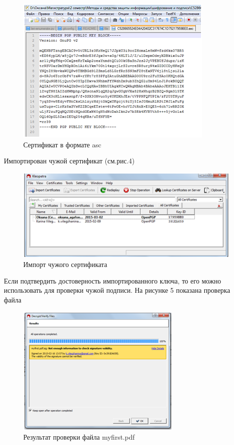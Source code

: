 \documentclass[10pt,a4paper]{article}
\begin{document}
\begin{figure}[h!]
\centering
\includegraphics[scale=0.67]{res/Sertifikat}
\caption{Сертификат в формате asc}
\end{figure}

\hspace{0,6cm}Импортирован чужой сертификат (см.рис.4)

\begin{figure}[h!]
\centering
\includegraphics[scale=0.67]{res/Sertifikat2}
\caption{Импорт чужого сертификата}
\end{figure}

\hspace{0,6cm} Если подтвердить достоверность импортированного ключа, то его можно использовать для проверки чужой подписи. На рисунке 5 показана проверка файла 

\begin{figure}[h!]
\centering
\includegraphics[scale=0.67]{res/Sign}
\caption{Результат проверки файла myfirst.pdf}
\end{figure}
\clearpage
\clearpage
\end{document}
